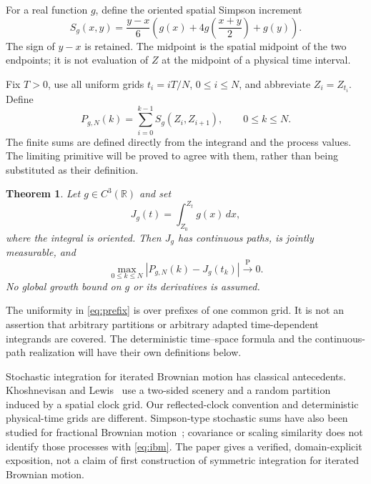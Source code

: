 \documentclass[11pt]{article}
\newtheorem{theorem}{Theorem}[section]
\theoremstyle{remark}\newtheorem{remark}[theorem]{Remark}
\newcommand{\R}{\mathbb R}\newcommand{\Pconv}{\xrightarrow{\mathrm P}}
\begin{document}
For a real function $g$, define the oriented spatial Simpson
increment
\begin{equation}\label{eq:simpson}
 S_g(x,y)=\frac{y-x}{6}
 \left(g(x)+4g\left(\frac{x+y}{2}\right)+g(y)\right).
\end{equation}
The sign of $y-x$ is retained. The midpoint is the spatial
midpoint of the two endpoints; it is not evaluation of $Z$ at
the midpoint of a physical time interval.

Fix $T>0$, use all uniform grids $t_i=iT/N$, $0\leq i\leq N$,
and abbreviate $Z_i=Z_{t_i}$. Define
\[
 P_{g,N}(k)=\sum_{i=0}^{k-1}S_g(Z_i,Z_{i+1}),\qquad0\leq k\leq N.
\]
The finite sums are defined directly from the integrand and the
process values. The limiting primitive will be proved to agree
with them, rather than being substituted as their definition.

\begin{theorem}\label{thm:spatial}
Let $g\in C^3(\R)$ and set
\[
 J_g(t)=\int_{Z_0}^{Z_t}g(x)\,dx,
\]
where the integral is oriented. Then $J_g$ has continuous paths,
is jointly measurable, and
\begin{equation}\label{eq:prefix}
 \max_{0\leq k\leq N}|P_{g,N}(k)-J_g(t_k)|\Pconv0.
\end{equation}
No global growth bound on $g$ or its derivatives is assumed.
\end{theorem}

The uniformity in \eqref{eq:prefix} is over prefixes of one
common grid. It is not an assertion that arbitrary partitions
or arbitrary adapted time-dependent integrands are covered.
The deterministic time--space formula and the continuous-path
realization will have their own definitions below.

Stochastic integration for iterated Brownian motion has classical
antecedents. Khoshnevisan and Lewis~\cite{kl} use a two-sided
scenery and a random partition induced by a spatial clock grid.
Our reflected-clock convention and deterministic physical-time
grids are different. Simpson-type stochastic sums have also been
studied for fractional Brownian motion~\cite{hn}; covariance or
scaling similarity does not identify those processes with
\eqref{eq:ibm}. The paper gives a verified, domain-explicit
exposition, not a claim of first construction of symmetric
integration for iterated Brownian motion.
\end{document}
